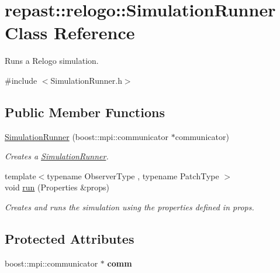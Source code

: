 \hypertarget{classrepast_1_1relogo_1_1_simulation_runner}{\section{repast\-:\-:relogo\-:\-:Simulation\-Runner Class Reference}
\label{classrepast_1_1relogo_1_1_simulation_runner}
}


Runs a Relogo simulation.  




{\ttfamily \#include $<$Simulation\-Runner.\-h$>$}

\subsection*{Public Member Functions}
\begin{DoxyCompactItemize}
\item 
\hypertarget{classrepast_1_1relogo_1_1_simulation_runner_a7042c8c929b9646f6fabe76c1476da38}{\hyperlink{classrepast_1_1relogo_1_1_simulation_runner_a7042c8c929b9646f6fabe76c1476da38}{Simulation\-Runner} (boost\-::mpi\-::communicator $\ast$communicator)}\label{classrepast_1_1relogo_1_1_simulation_runner_a7042c8c929b9646f6fabe76c1476da38}

\begin{DoxyCompactList}\small\item\em Creates a \hyperlink{classrepast_1_1relogo_1_1_simulation_runner}{Simulation\-Runner}. \end{DoxyCompactList}\item 
{\footnotesize template$<$typename Observer\-Type , typename Patch\-Type $>$ }\\void \hyperlink{classrepast_1_1relogo_1_1_simulation_runner_ac5e8c7119f3278f5c64190e6686e59d0}{run} (Properties \&props)
\begin{DoxyCompactList}\small\item\em Creates and runs the simulation using the properties defined in props. \end{DoxyCompactList}\end{DoxyCompactItemize}
\subsection*{Protected Attributes}
\begin{DoxyCompactItemize}
\item 
\hypertarget{classrepast_1_1relogo_1_1_simulation_runner_a4d616014a9f755de2d32784e449629cf}{boost\-::mpi\-::communicator $\ast$ {\bfseries comm}}\label{classrepast_1_1relogo_1_1_simulation_runner_a4d616014a9f755de2d32784e449629cf}

\end{DoxyCompactItemize}



